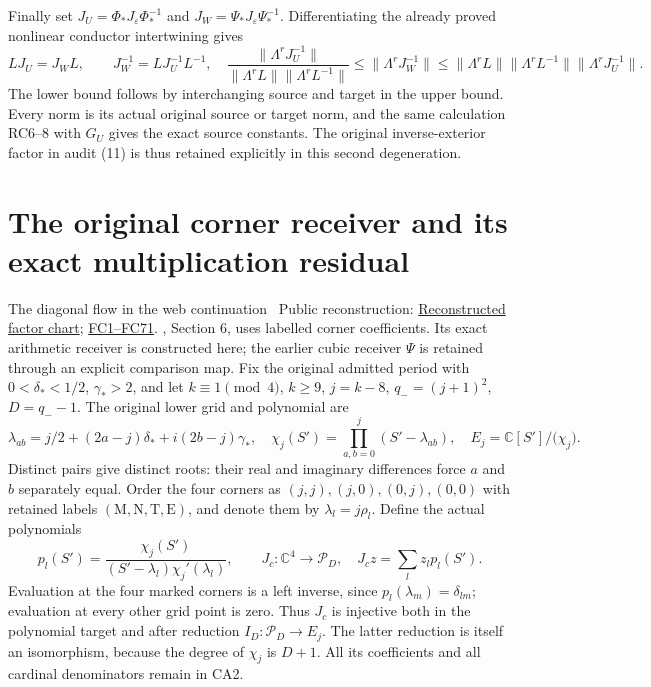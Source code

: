 \documentclass[11pt]{article}
\newcommand{\C}{\mathbb C}
\begin{document}
Finally set $J_U=\Phi_*J_\varepsilon\Phi_*^{-1}$ and
$J_W=\Psi_*J_\varepsilon\Psi_*^{-1}$. Differentiating the already
proved nonlinear conductor intertwining gives
\[
 LJ_U=J_WL,\qquad
 J_W^{-1}=LJ_U^{-1}L^{-1},\quad
 \frac{\|\Lambda^rJ_U^{-1}\|}
      {\|\Lambda^rL\|\|\Lambda^rL^{-1}\|}
 \le\|\Lambda^rJ_W^{-1}\|
 \le\|\Lambda^rL\|\|\Lambda^rL^{-1}\|
                       \|\Lambda^rJ_U^{-1}\|. \tag{RC9}
\]
The lower bound follows by interchanging source and target in the
upper bound. Every norm is its actual original source or target
norm, and the same calculation RC6--8 with $G_U$ gives the exact
source constants. The original inverse-exterior factor in audit
(11) is thus retained explicitly in this second degeneration.

\section{The original corner receiver and its exact multiplication residual}
The diagonal flow in the web continuation \cite{WebFable}%
~Public reconstruction: \href{https://github.com/KokunoYumeto/zeta-function-research-reader/blob/689a8f87e9c12b7a99b01b3123438c6751ee608f/workbenches/splitzero-tandem/continuations/20260920-fable-boundary-action/source_intake/PROOF.md\#L1}{Reconstructed factor chart}; \href{https://github.com/KokunoYumeto/zeta-function-research-reader/blob/689a8f87e9c12b7a99b01b3123438c6751ee608f/workbenches/splitzero-tandem/continuations/20260920-fable-conductor/FABLE_TO_ORIGINAL_CONDUCTOR.tex\#L52}{FC1--FC71}.%
{}, Section 6,
uses labelled corner coefficients. Its exact arithmetic receiver is
constructed here; the earlier cubic receiver $\Psi$ is retained through
an explicit comparison map. Fix the original admitted period with
$0<\delta_*<1/2$, $\gamma_*>2$, and let $k\equiv1\pmod4$,
$k\ge9$, $j=k-8$, $q_-=(j+1)^2$, $D=q_--1$. The original lower
grid and polynomial are
\[
 \lambda_{ab}=j/2+(2a-j)\delta_*+i(2b-j)\gamma_*,\quad
 \chi_j(S')=\prod_{a,b=0}^j(S'-\lambda_{ab}),\quad
 E_j=\C[S']/\bigl(\chi_j\bigr). \tag{CA1}
\]
Distinct pairs give distinct roots: their real and imaginary
differences force $a$ and $b$ separately equal. Order the four corners
as $(j,j),(j,0),(0,j),(0,0)$ with retained labels
$(\mathrm M,\mathrm N,\mathrm T,\mathrm E)$, and denote them by
$\lambda_l=j\rho_l$. Define the actual polynomials
\[
 p_l(S')=\frac{\chi_j(S')}
 {(S'-\lambda_l)\chi_j'(\lambda_l)},\qquad
 J_c:\C^4\longrightarrow\mathcal P_D,\quad
 J_c z=\sum_l z_l p_l(S'). \tag{CA2}
\]
Evaluation at the four marked corners is a left inverse, since
$p_l(\lambda_m)=\delta_{lm}$; evaluation at every other grid
point is zero. Thus $J_c$ is injective both in the polynomial
target and after reduction $I_D:\mathcal P_D\to E_j$.
The latter reduction is itself an isomorphism, because the
degree of $\chi_j$ is $D+1$. All its coefficients and all
cardinal denominators remain in CA2.
\end{document}
